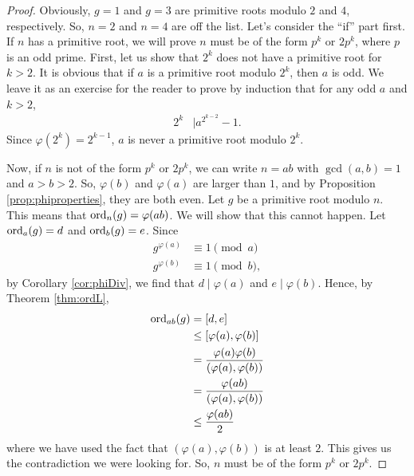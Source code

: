\documentclass{subfile}
\begin{document}
	\begin{proof}
		Obviously, $g=1$ and $g=3$ are primitive roots modulo $2$ and $4$, respectively. So, $n=2$ and $n=4$ are off the list. Let's consider the ``if'' part first. If $n$ has a primitive root, we will prove $n$ must be of the form $p^k$ or $2p^k$, where $p$ is an odd prime.
		First, let us show that $2^k$ does not have a primitive root for $k >2$. It is obvious that if $a$ is a primitive root modulo $2^k$, then $a$ is odd. We leave it as an exercise for the reader to prove by induction that for any odd $a$ and $k>2$,
			\begin{align*}
				2^k & \mid a^{2^{k-2}}-1.
			\end{align*}
		Since $\varphi(2^k)=2^{k-1}$, $a$ is never a primitive root modulo $2^k$.

		Now, if $n$ is not of the form $p^k$ or $2p^k$, we can write $n=ab$ with $\gcd(a,b)=1$ and $a>b>2$. So, $\varphi(b)$ and $\varphi(a)$ are larger than $1$, and by Proposition \ref{prop:phiproperties}, they are both even. Let $g$ be a primitive root modulo $n$. This means that $\operatorname{ord}_{n}(g)=\varphi(ab)$. We will show that this cannot happen. Let $\operatorname{ord}_a(g)=d$ and $\operatorname{ord}_b(g)=e$. Since
			\begin{align*}
				g^{\varphi(a)} & \equiv1\pmod a\\
				g^{\varphi(b)} & \equiv1\pmod b,
			\end{align*}
		by Corollary \eqref{cor:phiDiv}, we find that $d \mid \varphi(a)$ and $e\mid \varphi(b)$.
		Hence, by Theorem \eqref{thm:ordL},
			\begin{align*}
				\operatorname{ord}_{ab}(g)
					& =  [d,e]\\
					& \leq [\varphi(a),\varphi(b)]\\
					& = \dfrac{\varphi(a) \varphi(b)}{(\varphi(a), \varphi(b))}\\
					& = \dfrac{\varphi(ab)}{(\varphi(a), \varphi(b))}\\
					& \leq  \dfrac{\varphi(ab)}{2}
			\end{align*}
		where we have used the fact that $(\varphi(a),\varphi(b))$ is at least $2$. This gives us the contradiction we were looking for. So, $n$ must be of the form $p^k$ or $2p^k$.


\end{proof}
\end{document}
